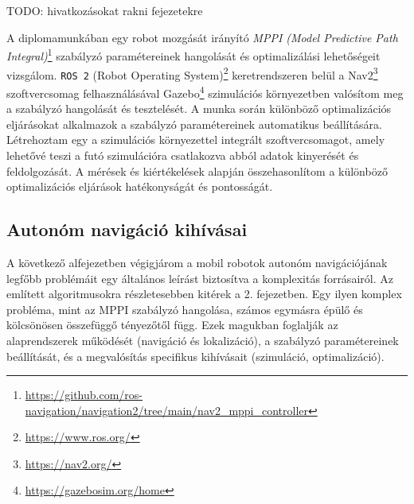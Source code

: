\chapter{\bevezetes}

TODO: hivatkozásokat rakni fejezetekre

A diplomamunkában egy robot mozgását irányító \emph{MPPI (Model Predictive Path Integral)}\footnote{\url{https://github.com/ros-navigation/navigation2/tree/main/nav2_mppi_controller}} szabályzó paramétereinek hangolását és optimalizálási lehetőségeit vizsgálom. \texttt{ROS 2} (Robot Operating System)\footnote{\url{https://www.ros.org/}} keretrendszeren belül a Nav2\footnote{\url{https://nav2.org/}} szoftvercsomag felhasználásával Gazebo\footnote{\url{https://gazebosim.org/home}} szimulációs környezetben valósítom meg a szabályzó hangolását és tesztelését. A munka során különböző optimalizációs eljárásokat alkalmazok a szabályzó paramétereinek automatikus beállítására. Létrehoztam egy a szimulációs környezettel integrált szoftvercsomagot, amely lehetővé teszi a futó szimulációra csatlakozva abból adatok kinyerését és feldolgozását. A mérések és kiértékelések alapján összehasonlítom a különböző optimalizációs eljárások hatékonyságát és pontosságát.

\section{Autonóm navigáció kihívásai}
A következő alfejezetben végigjárom a mobil robotok autonóm navigációjának legfőbb problémáit egy általános leírást biztosítva a komplexitás forrásairól. Az említett algoritmusokra részletesebben kitérek a 2. fejezetben. Egy ilyen komplex probléma, mint az MPPI szabályzó hangolása, számos egymásra épülő és kölcsönösen összefüggő tényezőtől függ. Ezek magukban foglalják az alaprendszerek működését (navigáció és lokalizáció), a szabályzó paramétereinek beállítását, és a megvalósítás specifikus kihívásait (szimuláció, optimalizáció).

